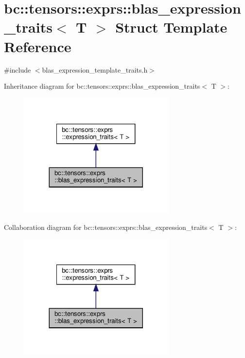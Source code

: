 \hypertarget{structbc_1_1tensors_1_1exprs_1_1blas__expression__traits}{}\section{bc\+:\+:tensors\+:\+:exprs\+:\+:blas\+\_\+expression\+\_\+traits$<$ T $>$ Struct Template Reference}
\label{structbc_1_1tensors_1_1exprs_1_1blas__expression__traits}


{\ttfamily \#include $<$blas\+\_\+expression\+\_\+template\+\_\+traits.\+h$>$}



Inheritance diagram for bc\+:\+:tensors\+:\+:exprs\+:\+:blas\+\_\+expression\+\_\+traits$<$ T $>$\+:\nopagebreak
\begin{figure}[H]
\begin{center}
\leavevmode
\includegraphics[width=224pt]{structbc_1_1tensors_1_1exprs_1_1blas__expression__traits__inherit__graph}
\end{center}
\end{figure}


Collaboration diagram for bc\+:\+:tensors\+:\+:exprs\+:\+:blas\+\_\+expression\+\_\+traits$<$ T $>$\+:\nopagebreak
\begin{figure}[H]
\begin{center}
\leavevmode
\includegraphics[width=224pt]{structbc_1_1tensors_1_1exprs_1_1blas__expression__traits__coll__graph}
\end{center}
\end{figure}
